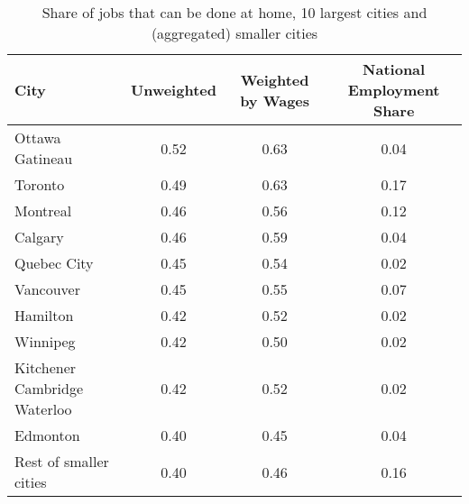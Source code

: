 \begin{table}[ht]
\centering
\caption{Share of jobs that can be done at home, 10 largest cities and (aggregated) smaller cities} 
\label{tab:table_cities_largest}
\begin{tabular}{lccc}
  \hline
City & Unweighted & Weighted by Wages & National Employment Share \\ 
  \hline
Ottawa   Gatineau & 0.52 & 0.63 & 0.04 \\ 
  Toronto & 0.49 & 0.63 & 0.17 \\ 
  Montreal & 0.46 & 0.56 & 0.12 \\ 
  Calgary & 0.46 & 0.59 & 0.04 \\ 
  Quebec City & 0.45 & 0.54 & 0.02 \\ 
  Vancouver & 0.45 & 0.55 & 0.07 \\ 
  Hamilton & 0.42 & 0.52 & 0.02 \\ 
  Winnipeg & 0.42 & 0.50 & 0.02 \\ 
  Kitchener   Cambridge   Waterloo & 0.42 & 0.52 & 0.02 \\ 
  Edmonton & 0.40 & 0.45 & 0.04 \\ 
  Rest of smaller cities & 0.40 & 0.46 & 0.16 \\ 
   \hline
\end{tabular}
\end{table}
